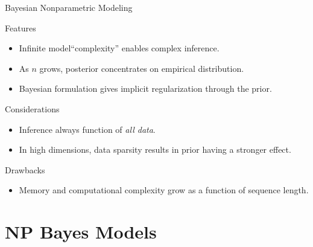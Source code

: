 \documentclass{beamer}
\begin{document}
\begin{frame}[t]{Bayesian Nonparametric Modeling}
	
	\begin{exampleblock}{Features}
		\begin{itemize}
			\item Infinite model``complexity'' enables complex inference.  
			\item As $n$ grows, posterior concentrates on empirical distribution.
			\item Bayesian formulation gives implicit regularization through the prior.
		\end{itemize}
	\end{exampleblock}

	\begin{block}{Considerations}
		\begin{itemize}
			\item Inference always function of {\em all data}.
			\item In high dimensions, data sparsity results in prior having a stronger effect.
		\end{itemize}
	\end{block}
	
	\begin{alertblock}{Drawbacks}
		\begin{itemize}
			\item Memory and computational complexity grow as a function of sequence length.
		\end{itemize}
	\end{alertblock}
\end{frame}	

\section{NP Bayes Models}
\end{document}
